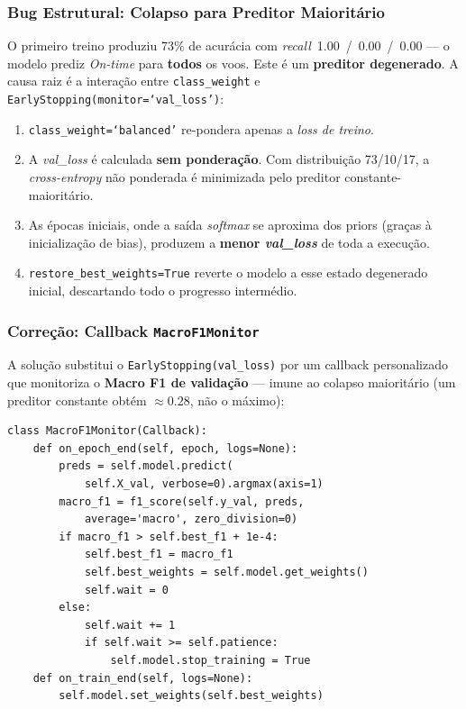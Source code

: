 \documentclass[conference]{IEEEtran}
\begin{document}
\subsubsection{Bug Estrutural: Colapso para Preditor Maioritário}

O primeiro treino produziu 73\% de acurácia com \textit{recall}~1.00~/~0.00~/~0.00
— o modelo prediz \textit{On-time} para \textbf{todos} os voos. Este é um
\textbf{preditor degenerado}. A causa raiz é a interação entre
\texttt{class\_weight} e \texttt{EarlyStopping(monitor=`val\_loss')}:

\begin{enumerate}
\item \texttt{class\_weight=`balanced'} re-pondera apenas a \textit{loss de treino}.
\item A \textit{val\_loss} é calculada \textbf{sem ponderação}. Com distribuição
      73/10/17, a \textit{cross-entropy} não ponderada é minimizada pelo preditor
      constante-maioritário.
\item As épocas iniciais, onde a saída \textit{softmax} se aproxima dos priors
      (graças à inicialização de bias), produzem a \textbf{menor \textit{val\_loss}}
      de toda a execução.
\item \texttt{restore\_best\_weights=True} reverte o modelo a esse estado degenerado
      inicial, descartando todo o progresso intermédio.
\end{enumerate}

\subsubsection{Correção: Callback \texttt{MacroF1Monitor}}

A solução substitui o \texttt{EarlyStopping(val\_loss)} por um callback personalizado
que monitoriza o \textbf{Macro F1 de validação} — imune ao colapso maioritário (um
preditor constante obtém $\approx 0.28$, não o máximo):

\begin{lstlisting}[caption=MacroF1Monitor (DeepLearning.py)]
class MacroF1Monitor(Callback):
    def on_epoch_end(self, epoch, logs=None):
        preds = self.model.predict(
            self.X_val, verbose=0).argmax(axis=1)
        macro_f1 = f1_score(self.y_val, preds,
            average='macro', zero_division=0)
        if macro_f1 > self.best_f1 + 1e-4:
            self.best_f1 = macro_f1
            self.best_weights = self.model.get_weights()
            self.wait = 0
        else:
            self.wait += 1
            if self.wait >= self.patience:
                self.model.stop_training = True
    def on_train_end(self, logs=None):
        self.model.set_weights(self.best_weights)
\end{lstlisting}
\end{document}
